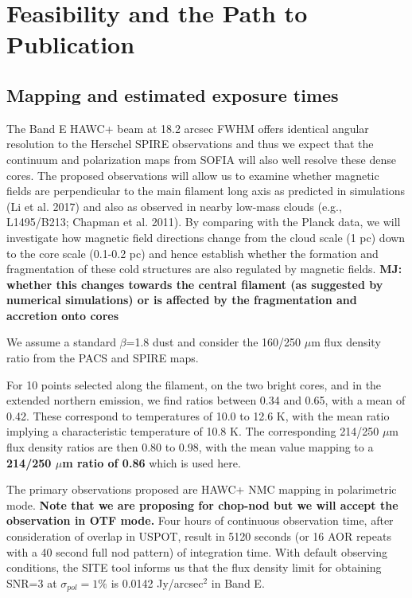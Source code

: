 \documentclass[11pt]{amsart}
\begin{document}
{\newpage
\section{Feasibility and the Path to Publication}

\subsection{Mapping and estimated exposure times\label{sec:exptime}}

The Band E HAWC+ beam at 18.2 arcsec FWHM offers identical angular resolution to the Herschel SPIRE observations
and thus we expect that the continuum and polarization maps from SOFIA will also well resolve these dense cores.
The proposed observations will allow us to examine whether magnetic fields are perpendicular to the main filament long axis as predicted in simulations (Li et al. 2017) and also as observed in nearby low-mass clouds (e.g., L1495/B213; Chapman et al. 2011). 
By comparing with the Planck data, we will investigate how magnetic field directions change from the 
cloud scale (1 pc) down to the core scale (0.1-0.2 pc) and hence establish whether the formation and fragmentation of these cold structures are also regulated by magnetic fields.
{\bf MJ: whether this changes towards the central filament (as suggested by numerical simulations) or is affected by the fragmentation and accretion onto cores}

We assume a standard $\beta$=1.8 dust and consider the 160/250 $\mu$m flux density ratio from the PACS and SPIRE maps. 

For 10 points selected along the filament, on the two bright cores, and in the extended northern emission, we find ratios between 0.34 and 0.65, with a mean of 0.42. These correspond to temperatures of 10.0 to 12.6 K, with the mean ratio implying a characteristic temperature of 10.8 K.  
The corresponding 214/250 $\mu$m flux density ratios are then 0.80 to 0.98, with the mean value mapping to a {\bf 214/250 $\mu$m ratio of 0.86} which is used here.
 
The primary observations proposed are HAWC+ NMC mapping in polarimetric mode. 
{\bf Note that we are proposing for chop-nod but we will accept the observation in OTF mode.}
Four hours of continuous observation time, after consideration of overlap in USPOT, result in 5120 seconds (or 16 AOR repeats with a 40 second full nod pattern) of
integration time. With default observing conditions, the SITE tool informs us that the flux density limit for obtaining SNR=3 at $\sigma_{pol}  = 1\%$
is 0.0142 Jy/arcsec$^2$ in Band E. 

}
\end{document}
